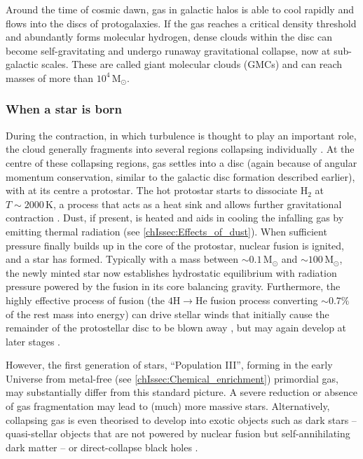 Around the time of cosmic dawn, gas in galactic halos is able to cool rapidly and flows into the discs of protogalaxies. If the gas reaches a critical density threshold and abundantly forms molecular hydrogen, dense clouds within the disc can become self-gravitating and undergo runaway gravitational collapse, now at sub-galactic scales. These are called giant molecular clouds (GMCs) and can reach masses of more than $10^4 \, \mathrm{M_\odot}$.

\subsubsection{When a star is born}
\label{chIsssec:When_a_star_is_born}

During the contraction, in which turbulence is thought to play an important role, the cloud generally fragments into several regions collapsing individually \citep[e.g.][]{2007ARA&A..45..565M}. At the centre of these collapsing regions, gas settles into a disc (again because of angular momentum conservation, similar to the galactic disc formation described earlier), with at its centre a protostar. The hot protostar starts to dissociate $\text{H}_2$ at $T \sim 2000 \, \mathrm{K}$, a process that acts as a heat sink and allows further gravitational contraction \citep{2010gfe..book.....M}. Dust, if present, is heated and aids in cooling the infalling gas by emitting thermal radiation (see \cref{chIssec:Effects_of_dust}). When sufficient pressure finally builds up in the core of the protostar, nuclear fusion is ignited, and a star has formed. Typically with a mass between $\sim 0.1 \, \mathrm{M_\odot}$ and $\sim 100 \, \mathrm{M_\odot}$, the newly minted star now establishes hydrostatic equilibrium with radiation pressure powered by the fusion in its core balancing gravity. Furthermore, the highly effective process of fusion (the $4\text{H} \rightarrow \text{He}$ fusion process converting $\sim 0.7\%$ of the rest mass into energy) can drive stellar winds that initially cause the remainder of the protostellar disc to be blown away \citep{2007ARA&A..45..565M}, but may again develop at later stages \citep{1999isw..book.....L}.

However, the first generation of stars, ``Population III'', forming in the early Universe from metal-free (see \cref{chIssec:Chemical_enrichment}) primordial gas, may substantially differ from this standard picture. A severe reduction or absence of gas fragmentation may lead to (much) more massive stars. Alternatively, collapsing gas is even theorised to develop into exotic objects such as dark stars -- quasi-stellar objects that are not powered by nuclear fusion but self-annihilating dark matter -- or direct-collapse black holes \citep{2013RPPh...76k2901B}.

